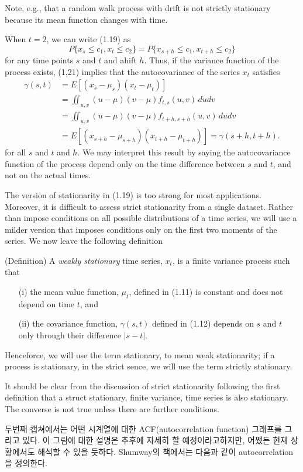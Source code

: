 \documentclass{article}
\begin{document}
Note, e.g., that a random walk process with drift is not strictly stationary because its mean function changes with time.

When \(t=2\), we can write (1.19) as
\[P\{x_s\le c_1,x_t\le c_2\}=P\{x_{s+h}\le c_1, x_{t+h}\le c_2\}\tag{1.21}\]
for any time points \(s\) and \(t\) and ahift \(h\).
Thus, if the variance function of the process exists, (1,21) implies that the autocovariance of the series \(x_t\) satisfies
\begin{align*}
\gamma(s,t)
&=E[(x_s-\mu_s)(x_t-\mu_t)]\\
&=\iint_{u,v}(u-\mu)(v-\mu)f_{t,s}(u,v)\,dudv\\
&=\iint_{u,v}(u-\mu)(v-\mu)f_{t+h,s+h}(u,v)\,dudv\\
&=E[(x_{s+h}-\mu_{s+h})(x_{t+h}-\mu_{t+h})]=\gamma(s+h,t+h).
\end{align*}
for all \(s\) and \(t\) and \(h\).
We may interpret this result by saying the autocovariance function of the process depend only on the time difference between \(s\) and \(t\), and not on the actual times.

The version of stationarity in (1.19) is too strong for most applications.
Moreover, it is difficult to assess strict stationarity from a single dataset.
Rather than impose conditions on all possible distributions of a time series, we will use a milder version that imposes conditions only on the first two moments of the series.
We now leave the following definition

(Definition)
A \emph{weakly stationary} time series, \(x_t\), is a finite variance process such that
\begin{enumerate}
\item[(i)]
the mean value function, \(\mu_t\), defined in (1.11) is constant and does not depend on time \(t\), and
\item[(ii)]
the covariance function, \(\gamma(s,t)\) defined in (1.12) depends on \(s\) and \(t\) only through their difference \(|s-t|\).
\end{enumerate}
Henceforce, we will use the term stationary, to mean weak stationarity;
if a process is stationary, in the strict sence, we will use the term strictly stationary.

It should be clear from the discussion of strict stationarity following the first definition that a struct stationary, finite variance, time series is also stationary.
The converse is not true unless there are further conditions.

두번째 캡쳐에서는 어떤 시계열에 대한 ACF(autocorrelation function) 그래프를 그리고 있다.
이 그림에 대한 설명은 추후에 자세히 할 예정이라고하지만, 어쨌든 현재 상황에서도 해석할 수 있을 듯하다.
Shumway의 책에서는 다음과 같이 autocorrelation을 정의한다.
\end{document}
